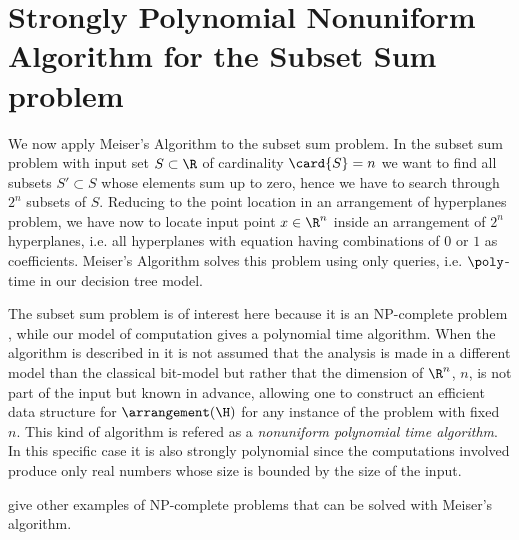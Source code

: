 \section{Strongly Polynomial Nonuniform Algorithm for the Subset Sum problem}

We now apply Meiser's Algorithm to the subset sum problem. In the subset sum
problem with input set $S \subset \R$ of cardinality $\card{S} = n$ we want to
find all subsets $S' \subset S$ whose elements sum up to zero, hence we have
to search through $2^n$ subsets of $S$. Reducing to the point location in an
arrangement of hyperplanes problem, we have now to locate input point $x \in
\R^n$ inside an arrangement of $2^n$ hyperplanes, i.e. all hyperplanes with
equation having combinations of $0$ or $1$ as coefficients. Meiser's Algorithm
solves this problem using only  queries, i.e. $\poly$-time
in our decision tree model.

The subset sum problem is of interest here because it is an NP-complete problem
\cite{karp:1972}, while our model of computation gives a polynomial time
algorithm. When the algorithm is described in \cite{burgisser:1997} it is not
assumed that the analysis is made in a different model than the classical
bit-model but rather that the dimension of $\R^n$, $n$, is not part of the input
but known in advance, allowing one to construct an efficient data structure for
$\arrangement(\H)$ for any instance of the problem with fixed $n$. This kind of
algorithm is refered as a \emph{nonuniform polynomial time algorithm}.  In
this specific case it is also strongly polynomial since the computations
involved produce only real numbers whose size is bounded by the size of the
input.

\citet*{meiser:1993,burgisser:1997} give other examples of
NP-complete problems that can be solved with Meiser's algorithm.

